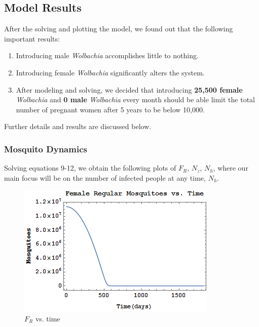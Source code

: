 \documentclass{article}
\begin{document}
\subsection{Model Results}
After the solving and plotting the model, we found out that the following important results:
\begin{enumerate}
    \item Introducing male \textit{Wolbachia} accomplishes little to nothing.
    \item Introducing female \textit{Wolbachia} significantly alters the system.
    \item After modeling and solving, we decided that introducing \textbf{25,500 female} \textit{Wolbachia} and \textbf{0 male} \textit{Wolbachia} every month should be able limit the total number of pregnant women after 5 years to be below 10,000.
\end{enumerate}
Further details and results are discussed below.
\subsubsection{Mosquito Dynamics}
Solving equations 9-12, we obtain the following plots of $F_R$, $N_z$, $N_h$, where our main focus will be on the number of infected people at any time, $N_h$. \\
\begin{figure}[h!]
  \includegraphics[width=\linewidth]{FrVst}
  \caption{$F_R$ vs. time}
  \label{fig:frvst}
\end{figure}
\end{document}
